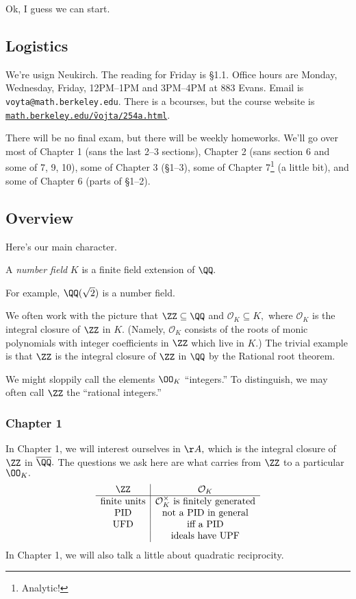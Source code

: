 







Ok, I guess we can start.

\subsection{Logistics}
We're usign Neukirch. The reading for Friday is \S1.1. Office hours are Monday, Wednesday, Friday, 12PM--1PM and 3PM--4PM at 883 Evans. Email is \texttt{voyta@math.berkeley.edu}. There is a bcourses, but the course website is \href{https://math.berkeley.edu/~vojta/254a.html}{\texttt{math.berkeley.edu/\~vojta/254a.html}}.

There will be no final exam, but there will be weekly homeworks. We'll go over most of Chapter 1 (sans the last 2--3 sections), Chapter 2 (sans section 6 and some of 7, 9, 10), some of Chapter 3 (\S1--3), some of Chapter 7\footnote{Analytic!} (a little bit), and some of Chapter 6 (parts of \S1--2).

\subsection{Overview}
Here's our main character.
\begin{defi}
    A \textit{number field} $K$ is a finite field extension of $\QQ.$
\end{defi}
\begin{ex}
    For example, $\QQ(\sqrt2)$ is a number field.
\end{ex}
We often work with the picture that $\ZZ\subseteq\QQ$ and $\mathcal O_K\subseteq K,$ where $\mathcal O_K$ is the integral closure of $\ZZ$ in $K.$ (Namely, $\mathcal O_K$ consists of the roots of monic polynomials with integer coefficients in $\ZZ$ which live in $K.$) The trivial example is that $\ZZ$ is the integral closure of $\ZZ$ in $\QQ$ by the Rational root theorem.
\begin{warn}
    We might sloppily call the elements $\OO_K$ ``integers.'' To distinguish, we may often call $\ZZ$ the ``rational integers.''
\end{warn}

\subsubsection{Chapter 1}
In Chapter 1, we will interest ourselves in $\AA,$ which is the integral closure of $\ZZ$ in $\overline\QQ.$ The questions we ask here are what carries from $\ZZ$ to a particular $\OO_K.$
\[\begin{array}{c|c}
    \ZZ & \mathcal O_K \\\hline
    \text{finite units} & \mathcal O_K^\times\text{ is finitely generated} \\
    \text{PID} & \text{not a PID in general} \\
    \text{UFD} & \text{iff a PID} \\
    & \text{ideals have UPF}
\end{array}\]
In Chapter 1, we will also talk a little about quadratic reciprocity.


